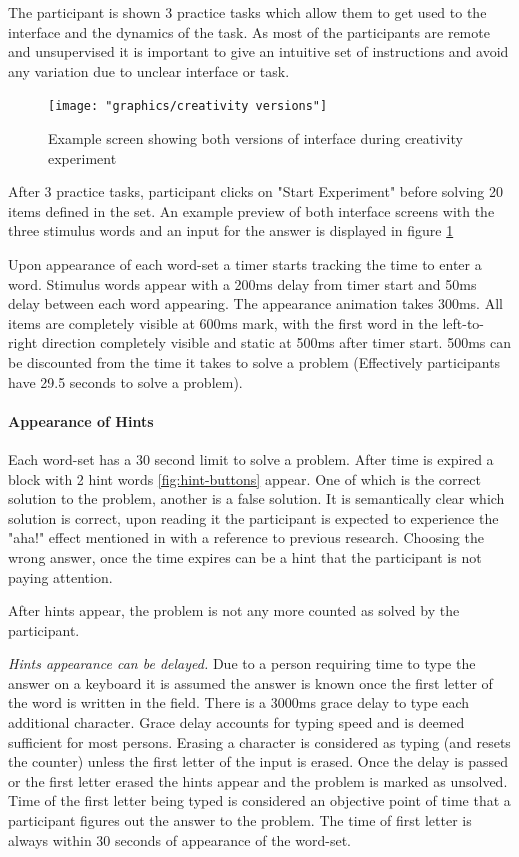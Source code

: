 		The participant is shown 3 practice tasks which allow them to get used to the interface and the dynamics of the task. As most of the participants are remote and unsupervised it is important to give an intuitive set of instructions and avoid any variation due to unclear interface or task.
		
		\begin{figure}[h]
			\centering
			\texttt{[image: "graphics/creativity versions"]}
			\caption{Example screen showing both versions of interface during creativity experiment}
			\label{fig:creativity-versions}
		\end{figure}
	
		After 3 practice tasks, participant clicks on "Start Experiment" before solving 20 items defined in the set. An example preview of both interface screens with the three stimulus words and an input for the answer is displayed in figure \ref{fig:creativity-versions} 
		
		Upon appearance of each word-set a timer starts tracking the time to enter a word.
		Stimulus words appear with a 200ms delay from timer start and 50ms delay between each word appearing. The appearance animation takes 300ms. All items are completely visible at 600ms mark, with the first word in the left-to-right direction completely visible and static at 500ms after timer start. 500ms can be discounted from the time it takes to solve a problem (Effectively participants have 29.5 seconds to solve a problem).
		
		\paragraph{Appearance of Hints}
		
		Each word-set has a 30 second limit to solve a problem. After time is expired a block with 2 hint words \ref{fig:hint-buttons} appear. One of which is the correct solution to the problem, another is a false solution. It is semantically clear which solution is correct, upon reading it the participant is expected to experience the "aha!" effect mentioned in \cite[p.634]{Bowden} with a reference to previous research. Choosing the wrong answer, once the time expires can be a hint that the participant is not paying attention.
		
		After hints appear, the problem is not any more counted as solved by the participant. 
		
		\textit{Hints appearance can be delayed.} Due to a person requiring time to type the answer on a keyboard it is assumed the answer is known once the first letter of the word is written in the field. There is a 3000ms grace delay to type each additional character. Grace delay accounts for typing speed and is deemed sufficient for most persons. Erasing a character is considered as typing (and resets the counter) unless the first letter of the input is erased. Once the delay is passed or the first letter erased the hints appear and the problem is marked as unsolved. Time of the first letter being typed is considered an objective point of time that a participant figures out the answer to the problem. The time of first letter is always within 30 seconds of appearance of the word-set.
		
